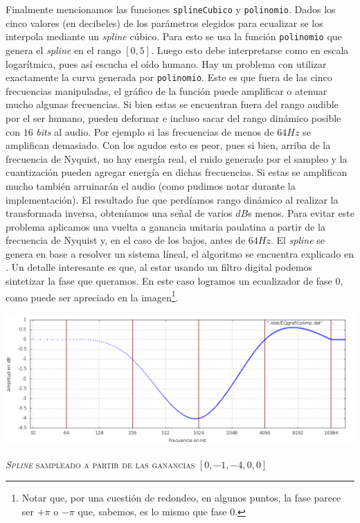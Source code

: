 \documentclass[%
    compressed,
    titlepage,
    narroweqnarray,
    inline,
    twoside,
    ]{ieee}
\begin{document}
Finalmente mencionamos las funciones \texttt{splineCubico} y \texttt{polinomio}.
Dados los cinco valores (en decibeles) de los par\'ametros elegidos para ecualizar se los interpola mediante un \textit{spline} c\'ubico.
Para esto se usa la funci\'on \texttt{polinomio} que genera el \textit{spline} en el rango $[0,5]$. Luego esto debe interpretarse como en escala logar\'itmica,
pues as\'i escucha el o\'ido humano. Hay un problema con utilizar exactamente la curva generada por \texttt{polinomio}. Este es que fuera de las cinco frecuencias
manipuladas, el gr\'afico de la funci\'on puede amplificar o atenuar mucho algunas frecuencias. Si bien estas se encuentran fuera del rango audible
por el ser humano, pueden deformar e incluso sacar del rango din\'amico posible con $16$ \textit{bits} al audio. Por ejemplo si las frecuencias de menos de $64Hz$
se amplifican demasiado. Con los agudos esto es peor, pues si bien, arriba de la frecuencia de Nyquist, no hay energ\'ia real, el ruido generado por el
sampleo y la cuantizaci\'on pueden agregar energ\'ia en dichas frecuencias. Si estas se amplifican mucho tambi\'en arruinar\'an el audio (como pudimos notar
durante la implementaci\'on). El resultado fue que perd\'iamos rango din\'amico al realizar la transformada inversa, obten\'iamos una se\~nal de varios
$dB$s menos. Para evitar este problema aplicamos una vuelta a ganancia unitaria paulatina a partir de la frecuencia de Nyquist y, en el caso de los bajos, antes
de $64Hz$.
El \textit{spline} se genera en base a resolver un sistema l\'ineal, el algoritmo se encuentra explicado en \cite{spline}.
Un detalle interesante es que, al estar usando un filtro digital podemos sintetizar la fase que queramos. En este caso logramos un ecualizador de fase $0$,
como puede ser apreciado en la imagen\footnote{Notar que, por una cuesti\'on de redondeo, en algunos puntos, la fase parece ser $+\pi$ o $-\pi$ que, sabemos,
es lo mismo que fase $0$.}.

\includegraphics[width=1\textwidth]{img/EQgraficoAmp.png}
\begin{center} \textsc{\textit{Spline} sampleado a partir de las ganancias $[0,-1,-4,0,0]$} \end{center}
\end{document}
